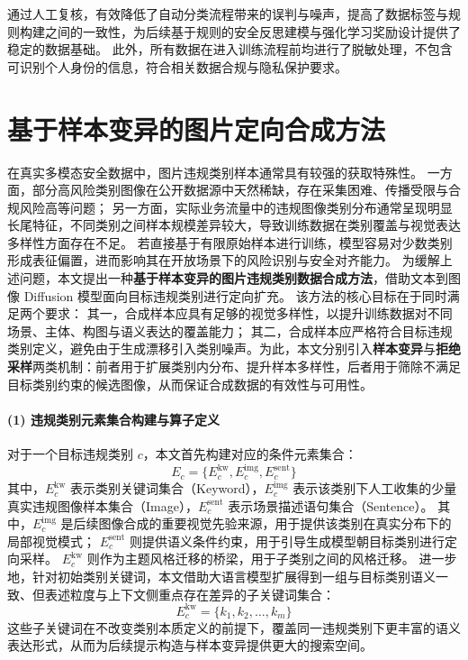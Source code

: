 通过人工复核，有效降低了自动分类流程带来的误判与噪声，提高了数据标签与规则构建之间的一致性，为后续基于规则的安全反思建模与强化学习奖励设计提供了稳定的数据基础。
此外，所有数据在进入训练流程前均进行了脱敏处理，不包含可识别个人身份的信息，符合相关数据合规与隐私保护要求。

\section{基于样本变异的图片定向合成方法}
在真实多模态安全数据中，图片违规类别样本通常具有较强的获取特殊性。
一方面，部分高风险类别图像在公开数据源中天然稀缺，存在采集困难、传播受限与合规风险高等问题；
另一方面，实际业务流量中的违规图像类别分布通常呈现明显长尾特征，不同类别之间样本规模差异较大，导致训练数据在类别覆盖与视觉表达多样性方面存在不足。
若直接基于有限原始样本进行训练，模型容易对少数类别形成表征偏置，进而影响其在开放场景下的风险识别与安全对齐能力。
为缓解上述问题，本文提出一种\textbf{基于样本变异的图片违规类别数据合成方法}，借助文本到图像 Diffusion 模型面向目标违规类别进行定向扩充。
该方法的核心目标在于同时满足两个要求：
其一，合成样本应具有足够的视觉多样性，以提升训练数据对不同场景、主体、构图与语义表达的覆盖能力；
其二，合成样本应严格符合目标违规类别定义，避免由于生成漂移引入类别噪声。为此，本文分别引入\textbf{样本变异}与\textbf{拒绝采样}两类机制：前者用于扩展类别内分布、提升样本多样性，后者用于筛除不满足目标类别约束的候选图像，从而保证合成数据的有效性与可用性。

\paragraph{(1) 违规类别元素集合构建与算子定义}

对于一个目标违规类别 $c$，本文首先构建对应的条件元素集合：
\begin{equation}
E_c = \{E_c^{\mathrm{kw}}, E_c^{\mathrm{img}}, E_c^{\mathrm{sent}}\}
\end{equation}
其中，$E_c^{\mathrm{kw}}$ 表示类别关键词集合（Keyword），$E_c^{\mathrm{img}}$ 表示该类别下人工收集的少量真实违规图像样本集合（Image），$E_c^{\mathrm{sent}}$ 表示场景描述语句集合（Sentence）。
其中，$E_c^{\mathrm{img}}$ 是后续图像合成的重要视觉先验来源，用于提供该类别在真实分布下的局部视觉模式；
$E_c^{\mathrm{sent}}$ 则提供语义条件约束，用于引导生成模型朝目标类别进行定向采样。
$E_c^{\mathrm{kw}}$ 则作为主题风格迁移的桥梁，用于子类别之间的风格迁移。
进一步地，针对初始类别关键词，本文借助大语言模型扩展得到一组与目标类别语义一致、但表述粒度与上下文侧重点存在差异的子关键词集合：
\begin{equation}
E_c^{\mathrm{kw}} = \{k_1, k_2, \dots, k_m\}
\end{equation}
这些子关键词在不改变类别本质定义的前提下，覆盖同一违规类别下更丰富的语义表达形式，从而为后续提示构造与样本变异提供更大的搜索空间。

